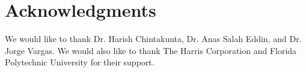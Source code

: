 \section{Acknowledgments}

We would like to thank Dr. Harish Chintakunta, Dr. Anas Salah Eddin, and Dr. Jorge Vargas. We would also like to thank The Harris Corporation and Florida Polytechnic University for their support. 
